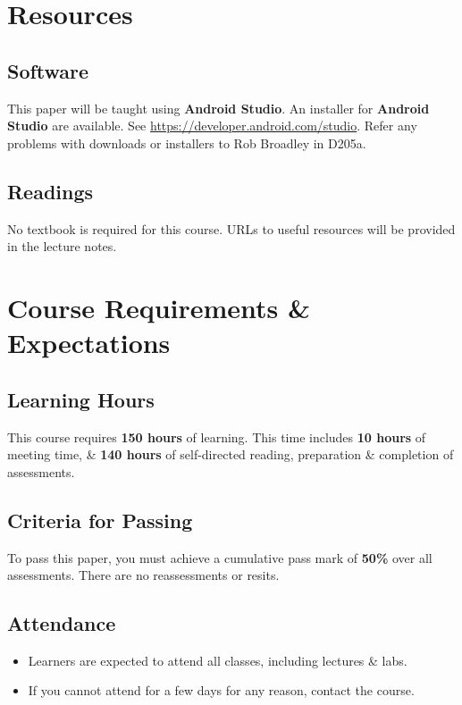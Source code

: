 \documentclass{article}
\begin{document}
\section*{Resources}

\subsection*{Software}
This paper will be taught using \textbf{Android Studio}. An installer for \textbf{Android Studio} are available. See \href{https://developer.android.com/studio/}{https://developer.android.com/studio}. Refer any problems with downloads or installers to Rob Broadley in D205a.

\subsection*{Readings}
No textbook is required for this course. URLs to useful resources will be provided in the lecture notes.

\section*{Course Requirements \& Expectations}

\subsection*{Learning Hours}
This course requires \textbf{150 hours} of learning. This time includes \textbf{10 hours} of meeting time, \& \textbf{140 hours} of self-directed reading, preparation \& completion of assessments.

\subsection*{Criteria for Passing}
To pass this paper, you must achieve a cumulative pass mark of \textbf{50\%} over all assessments. There are no reassessments or resits.

\subsection*{Attendance}
\begin{itemize}
	\item Learners are expected to attend all classes, including lectures \& labs.
	\item If you cannot attend for a few days for any reason, contact the course.
\end{itemize}
\end{document}

